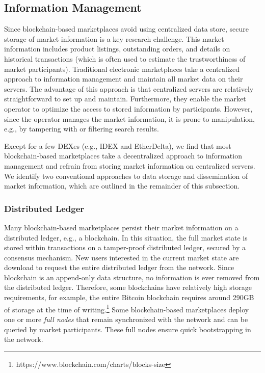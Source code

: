 \subsection{Information Management}
Since blockchain-based marketplaces avoid using centralized data store, secure storage of market information is a key research challenge.
This market information includes product listings, outstanding orders, and details on historical transactions (which is often used to estimate the trustworthiness of market participants).
Traditional electronic marketplaces take a centralized approach to information management and maintain all market data on their servers.
The advantage of this approach is that centralized servers are relatively straightforward to set up and maintain.
Furthermore, they enable the market operator to optimize the access to stored information by participants.
However, since the operator manages the market information, it is prone to manipulation, e.g., by tampering with or filtering search results.

Except for a few DEXes (e.g., IDEX and EtherDelta), we find that most blockchain-based marketplaces take a decentralized approach to information management and refrain from storing market information on centralized servers.
We identify two conventional approaches to data storage and dissemination of market information, which are outlined in the remainder of this subsection.

\subsubsection{Distributed Ledger}
Many blockchain-based marketplaces persist their market information on a distributed ledger, e.g., a blockchain.
In this situation, the full market state is stored within transactions on a tamper-proof distributed ledger, secured by a consensus mechanism.
New users interested in the current market state are download to request the entire distributed ledger from the network.
Since blockchain is an append-only data structure, no information is ever removed from the distributed ledger.
Therefore, some blockchains have relatively high storage requirements, for example, the entire Bitcoin blockchain requires around 290GB of storage at the time of writing.\footnote{https://www.blockchain.com/charts/blocks-size}
Some blockchain-based marketplaces deploy one or more \emph{full nodes} that remain synchronized with the network and can be queried by market participants.
These full nodes ensure quick bootstrapping in the network.

